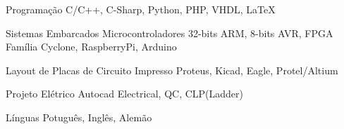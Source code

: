 

\begin{cvskills}

  \cvskill
    {Programação} %
    {C/C++, C-Sharp, Python, PHP, VHDL, LaTeX} %

  \cvskill
    {Sistemas Embarcados} %
    {Microcontroladores 32-bits ARM, 8-bits AVR, FPGA Família Cyclone, RaspberryPi, Arduino} %
 
  \cvskill
    {Layout de Placas de Circuito Impresso} %
    {Proteus, Kicad, Eagle, Protel/Altium} %
 
  \cvskill
    {Projeto Elétrico} %
    {Autocad Electrical, QC, CLP(Ladder)} %



  \cvskill
    {Línguas} %
    {Potuguês, Inglês, Alemão} %

\end{cvskills}
